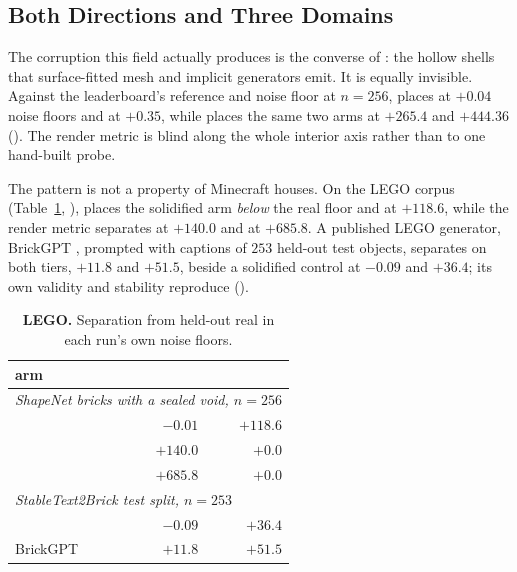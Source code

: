 \subsection{Both Directions and Three Domains}
\label{sec:hollow}

The corruption this field actually produces is the converse of \solidify{}: the hollow
shells that surface-fitted mesh and implicit generators emit. It is equally invisible. Against
the leaderboard's reference and noise floor at $n{=}256$, \mvkid{} places \hollow{} at $+0.04$
noise floors and \solidify{} at $+0.35$, while \vkid{} places the same two arms at $+265.4$
and $+444.36$ (). The render metric is blind along the whole interior
axis rather than to one hand-built probe.

\label{sec:lego}The pattern is not a property of Minecraft houses. On the LEGO corpus
(Table~\ref{tab:lego}, ), \mvkid{} places the solidified arm
\emph{below} the real floor and \vkid{} at $\mathbf{+118.6}$, while the render metric
separates \matshuffle{} at $+140.0$ and \monochrome{} at $+685.8$. A published LEGO
generator, BrickGPT \citep{pun2025brickgpt}, prompted with captions of $253$ held-out test
objects, separates on both tiers, $+11.8$ and $+51.5$, beside a solidified control at
$-0.09$ and $+36.4$; its own validity and stability reproduce ().

\begin{table}[t]
\centering
\small
\setlength{\tabcolsep}{4pt}
\caption{\textbf{LEGO.} Separation from held-out real in each run's own noise floors.}
\label{tab:lego}
\begin{tabular}{lrr}
\toprule
arm & \mvkid{} & \vkid{} \\
\midrule
\multicolumn{3}{l}{\emph{ShapeNet bricks with a sealed void, $n{=}256$}} \\
\solidify{}    & $\mathbf{-0.01}$ & $\mathbf{+118.6}$ \\
\matshuffle{}  & $+140.0$ & $+0.0$ \\
\monochrome{}  & $+685.8$ & $+0.0$ \\
\midrule
\multicolumn{3}{l}{\emph{StableText2Brick test split, $n{=}253$}} \\
\solidify{}    & $-0.09$ & $+36.4$ \\
BrickGPT \citep{pun2025brickgpt} & $+11.8$ & $+51.5$ \\
\bottomrule
\end{tabular}
\end{table}

